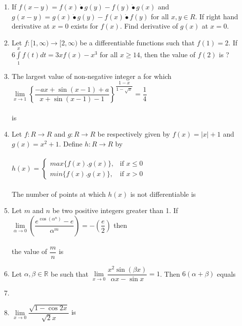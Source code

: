 \documentclass[journal,12pt,twocolumn]{IEEEtran}
\begin{document}
\begin{enumerate}
\item If $f(x-y)=f(x)\dot{•}g(y)-f(y)\dot{•}g(x)$ and $g(x-y)=g(x)\dot{•}g(y)-f(x)\dot{•}f(y)$ for all $x, y \in R$. If right hand derivative at $x=0$ exists for $f(x)$. Find derivative of $g(x)$ at $x=0$.\\

\item Let $f:[1,\infty) \to [2,\infty)$ be a differentiable functions such that $f(1)=2$. If $6\int\limits_1^xf(t)dt=3xf(x)-x^3$ for all $x \geq 14$, then the value of $f(2)$ is ?\\

\item The largest value of non-negative integer a for which \\
$\lim\limits_{x \to 1}\left\{\dfrac{-ax+\sin(x-1)+a}{x+\sin(x-1)-1}\right\}^{\dfrac{1-x}{1-\sqrt{x}}}=\dfrac{1}{4}$ \\ \\is
\\

\item Let $f: R \to R$ and $g: R \to R$ be respectively given by $f(x)=|x|+1$ and $g(x)=x^2+1$. Define $h: R \to R$ by \\ \\
$h(x)=\begin{cases}
max \{f(x).g(x)\}, &\text{if $x\leq 0$}\\
min \{f(x).g(x)\}, &\text{if $x>0$}
\end{cases}$\\ \\
The number of points at which $h(x)$ is not differentiable is\\

\item Let $m$ and $n$ be two positive integers greater than 1. If $\lim\limits_{\alpha \to 0}\left(\dfrac{e^{\cos(\alpha^n)}-e}{\alpha^m}\right)=-\left(\dfrac{e}{2}\right)$ then \\
\\the value of $\dfrac{m}{n}$ is

\item Let $\alpha, \beta \in \mathbb{R}$ be such that $\lim\limits_{x \to 0}\dfrac{x^2\sin(\beta x)}{\alpha x-\sin x}=1$. Then $6(\alpha+\beta)$ equals \item[~]

\item $\lim\limits_{x \to 0}\dfrac{\sqrt{1-\cos 2x}}{\sqrt{2}x}$ is
\begin{itemize}
\end{itemize}


\end{enumerate}
\end{document}
